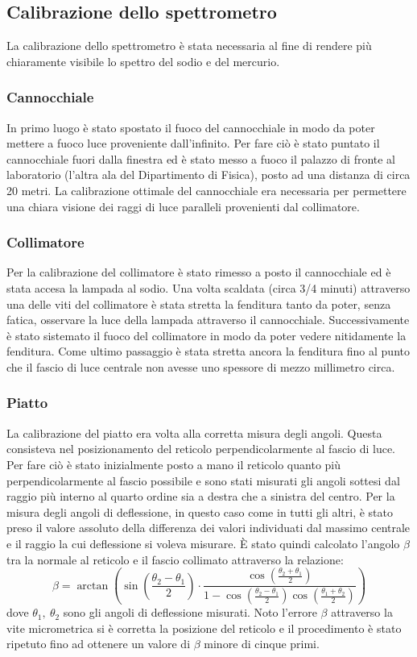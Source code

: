 \documentclass[a4paper,10pt]{article}
\begin{document}
	\subsection{Calibrazione dello spettrometro}
	La calibrazione dello spettrometro è stata necessaria al fine di rendere più chiaramente visibile lo spettro del sodio e del mercurio. \\
	\subsubsection*{Cannocchiale}
	In primo luogo è stato spostato il fuoco del cannocchiale in modo da poter mettere a fuoco luce proveniente dall'infinito. Per fare ciò è stato puntato il cannocchiale fuori dalla finestra ed è stato messo a fuoco il palazzo di fronte al laboratorio (l'altra ala del Dipartimento di Fisica), posto ad una distanza di circa 20 metri.
	La calibrazione ottimale del cannocchiale era necessaria per permettere una chiara visione dei raggi di luce paralleli provenienti dal collimatore.\\
	\subsubsection*{Collimatore}
	Per la calibrazione del collimatore è stato rimesso a posto il cannocchiale ed è stata accesa la lampada al sodio. Una volta scaldata (circa 3/4 minuti) attraverso una delle viti del collimatore è stata stretta la fenditura tanto da poter, senza fatica, osservare la luce della lampada attraverso il cannocchiale. Successivamente è stato sistemato il fuoco del collimatore in modo da poter vedere nitidamente la fenditura. Come ultimo passaggio è stata stretta ancora la fenditura fino al punto che il fascio di luce centrale non avesse uno spessore di mezzo millimetro circa.
	\subsubsection*{Piatto}
	La calibrazione del piatto era volta alla corretta misura degli angoli. Questa consisteva nel posizionamento del reticolo perpendicolarmente al fascio di luce.\\
	Per fare ciò è stato inizialmente posto a mano il reticolo quanto più perpendicolarmente al fascio possibile e sono stati misurati gli angoli sottesi dal raggio più interno al quarto ordine sia a destra che a sinistra del centro. Per la misura degli angoli di deflessione, in questo caso come in tutti gli altri, è stato preso il valore assoluto della differenza dei valori individuati dal massimo centrale e il raggio la cui deflessione si voleva misurare. È stato quindi calcolato l'angolo $ \beta $ tra la normale al reticolo e il fascio collimato attraverso la relazione:
	\[ \beta = \arctan \left( \sin \left( \frac{\theta_2-\theta_1}{2} \right) \cdot \dfrac { \cos \left( \frac{\theta_2 + \theta_1}{2}\right)} {1- \cos \left( \frac{\theta_2-\theta_1}{2} \right) \cos \left( \frac{\theta_1+\theta_2}{2}\right)} \right) \]
	dove $ \theta_1, \ \theta_2 $ sono gli angoli di deflessione misurati. Noto l'errore $ \beta $ attraverso la vite micrometrica si è corretta la posizione del reticolo e il procedimento è stato ripetuto fino ad ottenere un valore di $ \beta $ minore di cinque primi.
\end{document}
